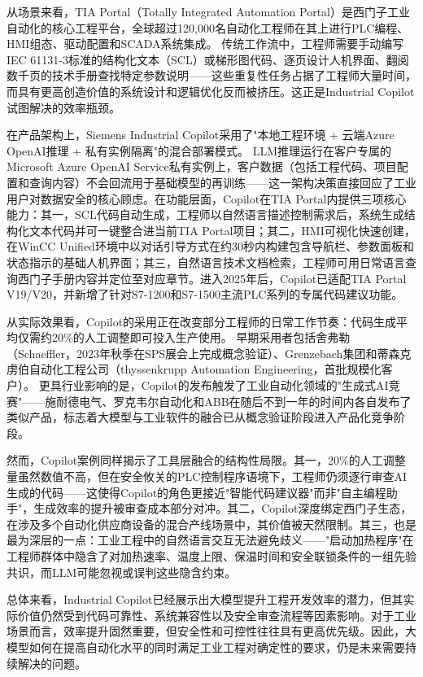 \documentclass[12pt,a4paper]{ctexart}
\begin{document}
从场景来看，TIA Portal（Totally Integrated Automation Portal）是西门子工业自动化的核心工程平台，全球超过120,000名自动化工程师在其上进行PLC编程、HMI组态、驱动配置和SCADA系统集成。\cite{siemens2024xcelerator} 传统工作流中，工程师需要手动编写IEC 61131-3标准的结构化文本（SCL）或梯形图代码、逐页设计人机界面、翻阅数千页的技术手册查找特定参数说明——这些重复性任务占据了工程师大量时间，而具有更高创造价值的系统设计和逻辑优化反而被挤压。这正是Industrial Copilot试图解决的效率瓶颈。

在产品架构上，Siemens Industrial Copilot采用了"本地工程环境 + 云端Azure OpenAI推理 + 私有实例隔离"的混合部署模式。\cite{siemens2024press} LLM推理运行在客户专属的Microsoft Azure OpenAI Service私有实例上，客户数据（包括工程代码、项目配置和查询内容）不会回流用于基础模型的再训练——这一架构决策直接回应了工业用户对数据安全的核心顾虑。在功能层面，Copilot在TIA Portal内提供三项核心能力：其一，SCL代码自动生成，工程师以自然语言描述控制需求后，系统生成结构化文本代码并可一键整合进当前TIA Portal项目；其二，HMI可视化快速创建，在WinCC Unified环境中以对话引导方式在约30秒内构建包含导航栏、参数面板和状态指示的基础人机界面；其三，自然语言技术文档检索，工程师可用日常语言查询西门子手册内容并定位至对应章节。进入2025年后，Copilot已适配TIA Portal V19/V20，并新增了针对S7-1200和S7-1500主流PLC系列的专属代码建议功能。\cite{devicebase2025copilot}

从实际效果看，Copilot的采用正在改变部分工程师的日常工作节奏：代码生成平均仅需约20\%的人工调整即可投入生产使用。\cite{siemens2024xcelerator} 早期采用者包括舍弗勒（Schaeffler，2023年秋季在SPS展会上完成概念验证）、Grenzebach集团和蒂森克虏伯自动化工程公司（thyssenkrupp Automation Engineering，首批规模化客户）。\cite{marketscreener2024siemens} 更具行业影响的是，Copilot的发布触发了工业自动化领域的"生成式AI竞赛"——施耐德电气、罗克韦尔自动化和ABB在随后不到一年的时间内各自发布了类似产品，标志着大模型与工业软件的融合已从概念验证阶段进入产品化竞争阶段。

然而，Copilot案例同样揭示了工具层融合的结构性局限。其一，20\%的人工调整量虽然数值不高，但在安全攸关的PLC控制程序语境下，工程师仍须逐行审查AI生成的代码——这使得Copilot的角色更接近"智能代码建议器"而非"自主编程助手"，生成效率的提升被审查成本部分对冲。其二，Copilot深度绑定西门子生态，在涉及多个自动化供应商设备的混合产线场景中，其价值被天然限制。其三，也是最为深层的一点：工业工程中的自然语言交互无法避免歧义——"启动加热程序"在工程师群体中隐含了对加热速率、温度上限、保温时间和安全联锁条件的一组先验共识，而LLM可能忽视或误判这些隐含约束。

总体来看，Industrial Copilot已经展示出大模型提升工程开发效率的潜力，但其实际价值仍然受到代码可靠性、系统兼容性以及安全审查流程等因素影响。对于工业场景而言，效率提升固然重要，但安全性和可控性往往具有更高优先级。因此，大模型如何在提高自动化水平的同时满足工业工程对确定性的要求，仍是未来需要持续解决的问题。
\end{document}
